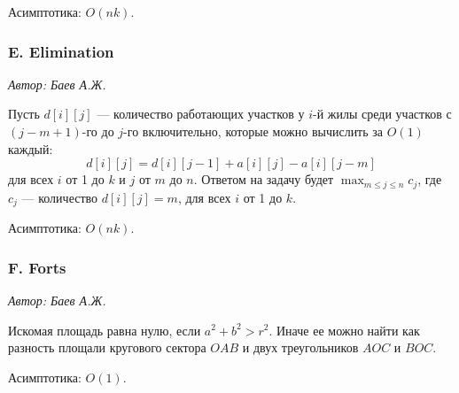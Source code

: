 \documentclass[11pt, a4paper]{article}
\newcommand{\problemauthor}[1]{
\begin{flushright}
\textit{Автор: #1}
\end{flushright}
}
\begin{document}
Асимптотика: $O(n k)$.



\subsubsection*{E. Elimination}

\problemauthor{ Баев А.Ж.}

Пусть $d[i][j]$ --- количество работающих участков у $i$-й жилы среди участков с $(j-m+1)$-го до $j$-го включительно, которые можно вычислить за $O(1)$ каждый:$$d[i][j] = d[i][j-1] + a[i][j] - a[i][j-m]$$
для всех $i$ от 1 до $k$ и $j$ от $m$ до $n$.
Ответом на задачу будет $\max_{m\leqslant j \leqslant n} c_j$,
где $c_j$ --- количество $d[i][j] = m$, для всех $i$ от 1 до $k$.

Асимптотика: $O(n k)$.



\subsubsection*{F. Forts}

\problemauthor{ Баев А.Ж.}

\begin{center}
\end{center}

Искомая площадь равна нулю, если $a^2 + b^2 > r^2$. Иначе ее можно найти как разность площали кругового сектора $OAB$ и двух треугольников $AOC$ и $BOC$.

Асимптотика: $O(1)$.
\end{document}
